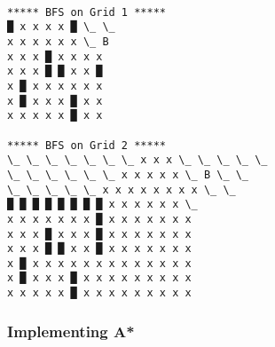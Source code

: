 \documentclass[11pt]{article}
\begin{document}
    \begin{Verbatim}[commandchars=\\\{\}]

***** BFS on Grid 1 *****
█ x x x x █ \_ \_
x x x x x x \_ B
x x x █ x x x x
x x x █ █ x x █
x █ x x x x x x
x █ x x x █ x x
x x x x x █ x x

***** BFS on Grid 2 *****
\_ \_ \_ \_ \_ \_ \_ x x x \_ \_ \_ \_ \_
\_ \_ \_ \_ \_ \_ x x x x x \_ B \_ \_
\_ \_ \_ \_ \_ x x x x x x x x \_ \_
█ █ █ █ █ █ █ █ x x x x x x \_
x x x x x x x █ x x x x x x x
x x x █ x x x █ x x x x x x x
x x x █ █ x x █ x x x x x x x
x █ x x x x x x x x x x x x x
x █ x x x █ x x x x x x x x x
x x x x x █ x x x x x x x x x

    \end{Verbatim}

    \hypertarget{implementing-a}{%
\subsubsection{Implementing A*}\label{implementing-a}}
\end{document}

